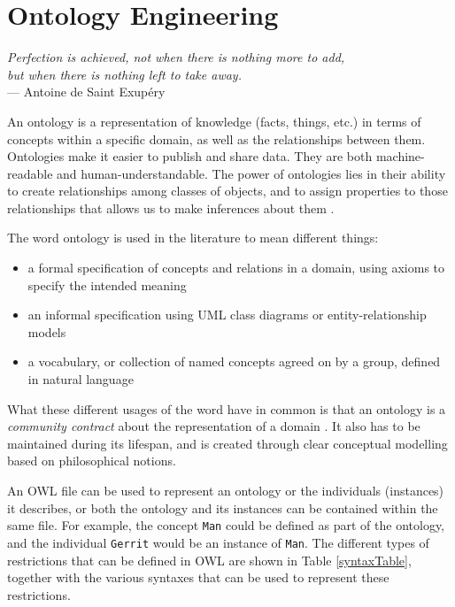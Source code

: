 \chapter{Ontology Engineering}
\label{OntologyEngineering}

\begin{flushright}{\slshape    
Perfection is achieved, not when there is nothing more to add, \\
but when there is nothing left to take away.} \\ \medskip
    ---  Antoine de Saint Exup\'ery
\end{flushright}

An ontology is a representation of knowledge (facts, things, etc.) in terms of concepts within a specific domain, as well as the relationships between them. Ontologies make it easier to publish and share data. They are both machine-readable and human-understandable. The power of ontologies lies in their ability to create relationships among classes of objects, and to assign properties to those relationships that allows us to make inferences about them \cite{Jepsen2009}.

The word ontology is used in the literature to mean different things:
\begin{itemize}
	\item a formal specification of concepts and relations in a domain, using axioms to specify the intended meaning
	\item an informal specification using UML class diagrams or entity-relationship models
	\item a vocabulary, or collection of named concepts agreed on by a group, defined in natural language
\end{itemize}

What these different usages of the word have in common is that an ontology is a \emph{community contract}\label{CommunityContract} about the representation of a domain \cite{Hepp2007}. It also has to be maintained during its lifespan, and is created through clear conceptual modelling based on philosophical notions. 

An \ac{OWL} file can be used to represent an ontology or the individuals (instances) it describes, or both the ontology and its instances can be contained within the same file. For example, the concept \texttt{Man} could be defined as part of the ontology, and the individual \texttt{Gerrit} would be an instance of \texttt{Man}. The different types of restrictions that can be defined in \ac{OWL} are shown in Table \ref{syntaxTable}, together with the various syntaxes that can be used to represent these restrictions.

